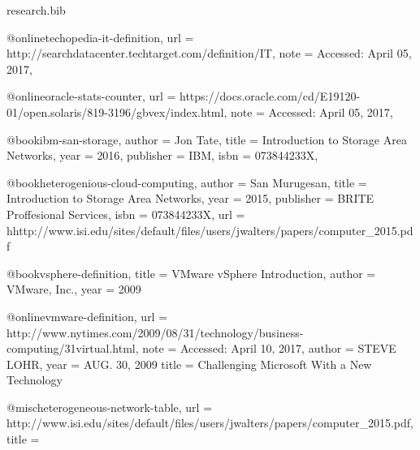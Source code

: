 \documentclass{article}
\begin{document}
\begin{filecontents*}{research.bib}
    
    @online{techopedia-it-definition,
        url = {http://searchdatacenter.techtarget.com/definition/IT},
        note = {Accessed: April 05, 2017},
    }

    @online{oracle-stats-counter,
        url = {https://docs.oracle.com/cd/E19120-01/open.solaris/819-3196/gbvex/index.html},
        note = {Accessed: April 05, 2017},
    }

    @book{ibm-san-storage,
        author    = {Jon Tate},
        title     = {Introduction to Storage Area Networks},
        year      = {2016},
        publisher = {IBM},
        isbn      =  {073844233X},
    }

    @book{heterogenious-cloud-computing,
        author    = {San Murugesan},
        title     = {Introduction to Storage Area Networks},
        year      = {2015},
        publisher = {BRITE Proffesional Services},
        isbn      =  {073844233X},
        url = {hhttp://www.isi.edu/sites/default/files/users/jwalters/papers/computer_2015.pdf}
    }

    @book{vsphere-definition,
        title = {VMware vSphere Introduction},
        author = {VMware, Inc.},
        year = {2009}
    }

    @online{vmware-definition,
        url = {http://www.nytimes.com/2009/08/31/technology/business-computing/31virtual.html},
        note = {Accessed: April 10, 2017},
        author = {STEVE LOHR},
        year = {AUG. 30, 2009}
        title = {Challenging Microsoft With a New Technology}
    }

    @misc{heterogeneous-network-table,
        url = {http://www.isi.edu/sites/default/files/users/jwalters/papers/computer_2015.pdf},
        title = {}
    }

\end{filecontents*}


\end{document}
